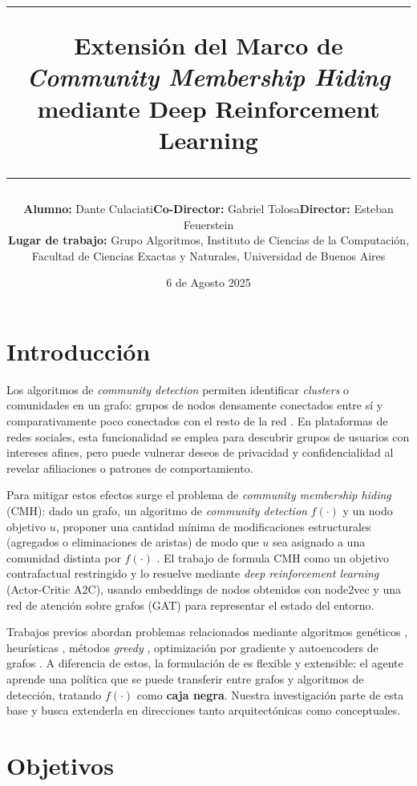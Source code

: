 \documentclass[11pt,a4paper]{article}
\title{
    \vspace{-1.5cm} %
    \hrule
    \vspace{0.05cm}
    \textbf{Extensión del Marco de \textit{Community Membership Hiding} mediante Deep Reinforcement Learning}
    \vspace{0.2cm}
    \hrule
    \vspace{-0.5cm}
}
\author{
    \begin{tabular}{lll}
        \textbf{Alumno:} Dante Culaciati & \textbf{Co-Director:} Gabriel Tolosa & \textbf{Director:} Esteban Feuerstein \\[0.1cm]
        \multicolumn{3}{l}{\textbf{Lugar de trabajo:} Grupo Algoritmos, Instituto de Ciencias de la Computación,}\\
        \multicolumn{3}{l}{Facultad de Ciencias Exactas y Naturales, Universidad de Buenos Aires}
    \end{tabular}
}
\date{\vspace{-0.2cm} 6 de Agosto 2025} %
\begin{document}
\maketitle
\vspace{-1.2cm}

\section*{Introducción}

Los algoritmos de \textit{community detection} permiten identificar \textit{clusters} o comunidades en un grafo: grupos de nodos densamente conectados entre sí y comparativamente poco conectados con el resto de la red \cite{Fortunato-2010}.
En plataformas de redes sociales, esta funcionalidad se emplea para descubrir grupos de usuarios con intereses afines, pero puede vulnerar deseos de privacidad y confidencialidad al revelar afiliaciones o patrones de comportamiento.

Para mitigar estos efectos surge el problema de \textit{community membership hiding} (CMH): dado un grafo, un algoritmo de \textit{community detection} $f(\cdot)$ y un nodo objetivo $u$, proponer una cantidad mínima de modificaciones estructurales (agregados o eliminaciones de aristas) de modo que $u$ sea asignado a una comunidad distinta por $f(\cdot)$ \cite{bernini-2024}.
El trabajo de \textcite{bernini-2024} formula CMH como un objetivo contrafactual restringido y lo resuelve mediante \textit{deep reinforcement learning} (Actor-Critic A2C), usando embeddings de nodos obtenidos con node2vec y una red de atención sobre grafos (GAT) para representar el estado del entorno.

Trabajos previos abordan problemas relacionados mediante algoritmos genéticos \cite{LIU2022123}, heurísticas \cite{Waniek_2018}, métodos \textit{greedy} \cite{9377481}, optimización por gradiente \cite{silvestri2025communitymembershiphidinggradientbased} y autoencoders de grafos \cite{LIU2022109495}.
A diferencia de estos, la formulación de \textcite{bernini-2024} es flexible y extensible: el agente aprende una política que se puede transferir entre grafos y algoritmos de detección, tratando $f(\cdot)$ como \textbf{caja negra}.
Nuestra investigación parte de esta base y busca extenderla en direcciones tanto arquitectónicas como conceptuales.

\section*{Objetivos}
\end{document}
